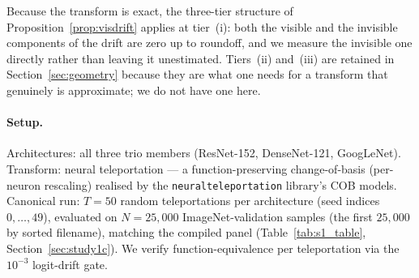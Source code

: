Because the transform is exact, the three-tier structure of
Proposition~\ref{prop:visdrift} applies at tier~(i): both the visible and the
invisible components of the drift are zero up to roundoff, and we measure the
invisible one directly rather than leaving it unestimated. Tiers~(ii) and~(iii)
are retained in Section~\ref{sec:geometry} because they are what one needs for a
transform that genuinely is approximate; we do not have one here.

\paragraph{Setup.}
Architectures: all three trio members (ResNet-152, DenseNet-121,
GoogLeNet). Transform: neural teleportation \citep{armenta2024neural} ---
a function-preserving change-of-basis (per-neuron rescaling) realised by
the \texttt{neuralteleportation} library's COB models. Canonical run:
$T = 50$ random teleportations per architecture (seed indices
$0,\ldots,49$), evaluated on $N = 25{,}000$ ImageNet-validation samples
(the first $25{,}000$ by sorted filename), matching the compiled panel
(Table~\ref{tab:s1_table}, Section~\ref{sec:study1c}). We verify
function-equivalence per teleportation via the $10^{-3}$ logit-drift
gate.

